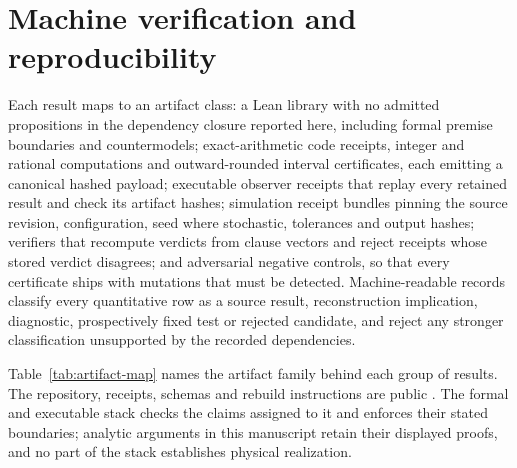 \documentclass[11pt]{article}
\theoremstyle{definition}
\theoremstyle{remark}
\begin{document}
\section{Machine verification and reproducibility}
\label{sec:verification}

Each result maps to an artifact class: a Lean library with no admitted
propositions in the dependency closure reported here, including formal
premise boundaries and countermodels; exact-arithmetic code receipts,
integer and rational computations and outward-rounded interval
certificates, each emitting a canonical hashed payload; executable observer
receipts that replay every retained result and check its artifact hashes;
simulation receipt bundles pinning the source revision, configuration, seed
where stochastic, tolerances and output hashes; verifiers that recompute
verdicts from clause vectors and reject receipts whose stored verdict
disagrees; and adversarial negative controls, so that every certificate
ships with mutations that must be detected. Machine-readable records classify
every quantitative row as a source result, reconstruction implication,
diagnostic, prospectively fixed test or rejected candidate, and reject any
stronger classification unsupported by the recorded dependencies.

Table~\ref{tab:artifact-map} names the artifact family behind each group of
results. The repository, receipts, schemas and rebuild instructions are
public \cite{ophrepo,ophsim,ophmodel}. The formal and executable stack checks
the claims assigned to it and enforces their stated boundaries; analytic
arguments in this manuscript retain their displayed proofs, and no part of
the stack establishes physical realization.
\end{document}
